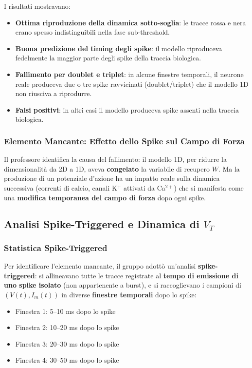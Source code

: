 I risultati mostravano:

\begin{itemize}
    \item \textbf{Ottima riproduzione della dinamica sotto-soglia}: le tracce rossa e nera erano spesso indistinguibili nella fase sub-threshold.
    \item \textbf{Buona predizione del timing degli spike}: il modello riproduceva fedelmente la maggior parte degli spike della traccia biologica.
    \item \textbf{Fallimento per doublet e triplet}: in alcune finestre temporali, il neurone reale produceva due o tre spike ravvicinati (doublet/triplet) che il modello 1D non riusciva a riprodurre.
    \item \textbf{Falsi positivi}: in altri casi il modello produceva spike assenti nella traccia biologica.
\end{itemize}

\subsubsection{Elemento Mancante: Effetto dello Spike sul Campo di Forza}

Il professore identifica la causa del fallimento: il modello 1D, per ridurre la dimensionalità da 2D a 1D, aveva \textbf{congelato} la variabile di recupero $W$. Ma la produzione di un potenziale d'azione ha un impatto reale sulla dinamica successiva (correnti di calcio, canali K$^+$ attivati da Ca$^{2+}$) che si manifesta come una \textbf{modifica temporanea del campo di forza} dopo ogni spike.



\subsection{Analisi Spike-Triggered e Dinamica di $V_T$}

\subsubsection{Statistica Spike-Triggered}

Per identificare l'elemento mancante, il gruppo adottò un'analisi \textbf{spike-triggered}: si allineavano tutte le tracce registrate al \textbf{tempo di emissione di uno spike isolato} (non appartenente a burst), e si raccoglievano i campioni di $(V(t), I_m(t))$ in diverse \textbf{finestre temporali} dopo lo spike:

\begin{itemize}
    \item Finestra 1: 5–10 ms dopo lo spike
    \item Finestra 2: 10–20 ms dopo lo spike
    \item Finestra 3: 20–30 ms dopo lo spike
    \item Finestra 4: 30–50 ms dopo lo spike
\end{itemize}

